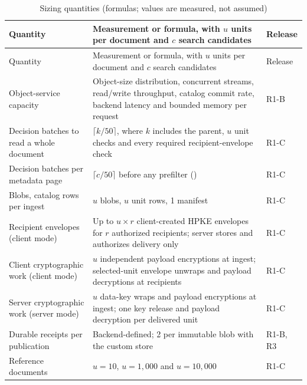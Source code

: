 \begin{longtable}{@{}P{0.28\textwidth}P{0.44\textwidth}P{0.18\textwidth}@{}}
\caption{Sizing quantities (formulas; values are measured, not assumed)}\label{tab:sizing}\\
\toprule Quantity & Measurement or formula, with $u$ units per document and $c$ search candidates & Release\\\midrule\endfirsthead
\toprule Quantity & Measurement or formula, with $u$ units per document and $c$ search candidates & Release\\\midrule\endhead
Object-service capacity & Object-size distribution, concurrent streams, read/write throughput, catalog commit rate, backend latency and bounded memory per request & R1-B\\
Decision batches to read a whole document & $\lceil k/50 \rceil$, where $k$ includes the parent, $u$ unit checks and every required recipient-envelope check & R1-C\\
Decision batches per metadata page & $\lceil c/50 \rceil$ before any prefilter () & R1-C\\
Blobs, catalog rows per ingest & $u$ blobs, $u$ unit rows, 1 manifest & R1-C\\
Recipient envelopes (client mode) & Up to $u \times r$ client-created HPKE envelopes for $r$ authorized recipients; server stores and authorizes delivery only & R1-C\\
Client cryptographic work (client mode) & $u$ independent payload encryptions at ingest; selected-unit envelope unwraps and payload decryptions at recipients & R1-C\\
Server cryptographic work (server mode) & $u$ data-key wraps and payload encryptions at ingest; one key release and payload decryption per delivered unit & R1-C\\
Durable receipts per publication & Backend-defined; 2 per immutable blob with the custom store & R1-B, R3\\
Reference documents & $u = 10$, $u = 1{,}000$ and $u = 10{,}000$ & R1-C\\
\bottomrule
\end{longtable}
